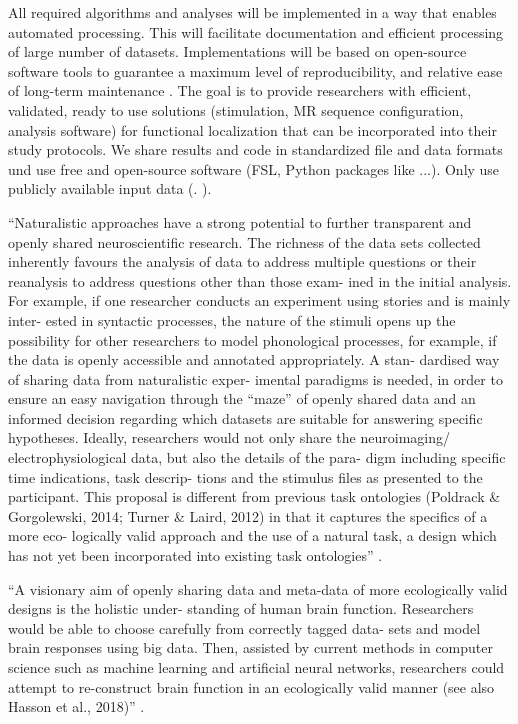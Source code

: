 %
All required algorithms and analyses will be implemented in a way that enables
automated processing.
%
This will facilitate documentation and efficient processing of large number of
datasets.
%
Implementations will be based on open-source software tools to guarantee a
maximum level of reproducibility, and relative ease of long-term maintenance
\citep{eglen2017toward}.
%
The goal is to provide researchers with efficient, validated, ready to use
solutions (stimulation, MR sequence configuration, analysis software) for
functional localization that can be incorporated into their study protocols.
%
We share results and code in standardized file and data formats und use free and
open-source software (FSL, Python packages like ...). Only use publicly
available input data (. \citep{glen2017toward}).


``Naturalistic approaches have a strong potential to further transparent and
openly shared neuroscientiﬁc research.  The richness of the data sets collected
inherently favours the analysis of data to address multiple questions or their
reanalysis to address questions other than those exam- ined in the initial
analysis. For example, if one researcher conducts an experiment using stories
and is mainly inter- ested in syntactic processes, the nature of the stimuli
opens up the possibility for other researchers to model phonological processes,
for example, if the data is openly accessible and annotated appropriately. A
stan- dardised way of sharing data from naturalistic exper- imental paradigms is
needed, in order to ensure an easy navigation through the “maze” of openly
shared data and an informed decision regarding which datasets are suitable for
answering speciﬁc hypotheses. Ideally, researchers would not only share the
neuroimaging/ electrophysiological data, but also the details of the para- digm
including speciﬁc time indications, task descrip- tions and the stimulus ﬁles as
presented to the participant. This proposal is diﬀerent from previous task
ontologies (Poldrack & Gorgolewski, 2014; Turner & Laird, 2012) in that it
captures the speciﬁcs of a more eco- logically valid approach and the use of a
natural task, a design which has not yet been incorporated into existing task
ontologies'' \citep{kandylaki2019story}.

%
``A visionary aim of openly sharing data and meta-data of more ecologically
valid designs is the holistic under- standing of human brain function.
Researchers would be able to choose carefully from correctly tagged data- sets
and model brain responses using big data. Then, assisted by current methods in
computer science such as machine learning and artiﬁcial neural networks,
researchers could attempt to re-construct brain function in an ecologically
valid manner (see also Hasson et al., 2018)'' \citep{kandylaki2019story}.


